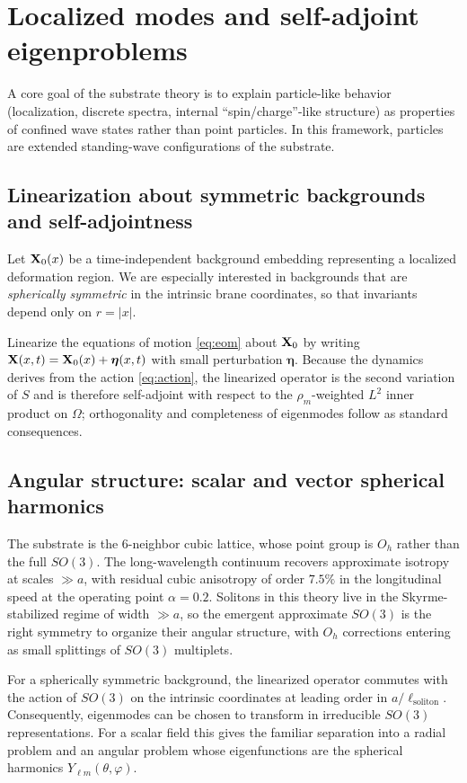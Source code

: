 \section{Localized modes and self-adjoint eigenproblems}
\label{sec:localized}

A core goal of the substrate theory is to explain particle-like behavior (localization, discrete spectra,
internal ``spin/charge''-like structure) as properties of confined wave states rather than point particles.
In this framework, particles are extended standing-wave configurations of the substrate.

\subsection{Linearization about symmetric backgrounds and self-adjointness}

Let $\mathbf{X}_0(x)$ be a time-independent background embedding representing a localized deformation region.
We are especially interested in backgrounds that are \emph{spherically symmetric} in the intrinsic brane coordinates,
so that invariants depend only on $r=|x|$.

Linearize the equations of motion \eqref{eq:eom} about $\mathbf{X}_0$ by writing
$\mathbf{X}(x,t)=\mathbf{X}_0(x)+\bm{\eta}(x,t)$ with small perturbation $\bm{\eta}$.
Because the dynamics derives from the action \eqref{eq:action}, the linearized operator is
the second variation of $S$ and is therefore self-adjoint with respect to the $\rho_m$-weighted
$L^2$ inner product on $\Omega$; orthogonality and completeness of eigenmodes follow as standard consequences.

\subsection{Angular structure: scalar and vector spherical harmonics}
\label{sec:angular-structure}

The substrate is the 6-neighbor cubic lattice, whose point group is $O_h$ rather than the full $SO(3)$. The
long-wavelength continuum recovers approximate isotropy at scales $\gg a$, with residual cubic anisotropy of order
$7.5\%$ in the longitudinal speed at the operating point $\alpha = 0.2$. Solitons in this theory live
in the Skyrme-stabilized regime of width $\gg a$, so the emergent approximate $SO(3)$ is the right symmetry to
organize their angular structure, with $O_h$ corrections entering as small splittings of $SO(3)$ multiplets.

For a spherically symmetric background, the linearized operator commutes with the action of $SO(3)$ on the
intrinsic coordinates at leading order in $a/\ell_{\mathrm{soliton}}$.
Consequently, eigenmodes can be chosen to transform in irreducible $SO(3)$ representations.
For a scalar field this gives the familiar separation into a radial problem and an angular problem whose
eigenfunctions are the spherical harmonics $Y_{\ell m}(\theta,\varphi)$.

